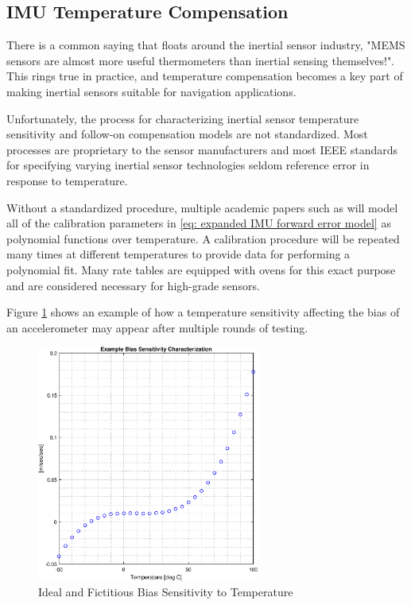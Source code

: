 \subsection{IMU Temperature Compensation}

There is a common saying that floats around the inertial sensor industry, "MEMS sensors are almost more useful thermometers than inertial sensing themselves!". This rings true in practice, and temperature compensation becomes a key part of making inertial sensors suitable for navigation applications. 

Unfortunately, the process for characterizing inertial sensor temperature sensitivity and follow-on compensation models are not standardized. Most processes are proprietary to the sensor manufacturers and most IEEE standards for specifying varying inertial sensor technologies \cite{IEEE_std_1293-2018,IEEE_std_1431-2004,IEEE_std_952-2020,IEEE_std_292-1969,IEEE_std_517-1974,IEEE_std_647-2006,IEEE_std_813-1988} seldom reference error in response to temperature. 

Without a standardized procedure, multiple academic papers such as \cite{9851744} will model all of the calibration parameters in \ref{eq: expanded IMU forward error model} as polynomial functions over temperature. A calibration procedure will be repeated many times at different temperatures to provide data for performing a polynomial fit. Many rate tables are equipped with ovens for this exact purpose and are considered necessary for high-grade sensors.

Figure \ref{fig: ideal and fictitious bias sensitivity to temperature} shows an example of how a temperature sensitivity affecting the bias of an accelerometer may appear after multiple rounds of testing.

\begin{figure}[h] 
	\centering
	\includegraphics[width=0.65\textwidth]{./images/ideal_bias_response_to_temperature.eps}
	\caption{Ideal and Fictitious Bias Sensitivity to Temperature}
	\label{fig: ideal and fictitious bias sensitivity to temperature}
\end{figure}
\FloatBarrier

